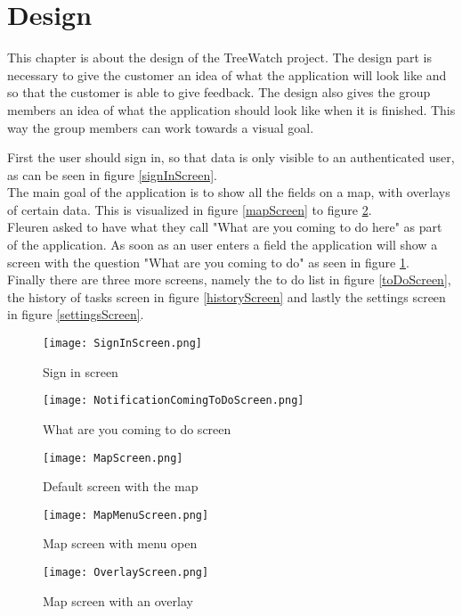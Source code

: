 \section{Design\label{sec:Design}}
This chapter is about the design of the TreeWatch project. The design part is necessary to give the customer an idea of what the application will look like and so that the customer is able to give feedback. The design also gives the group members an idea of what the application should look like when it is finished. This way the group members can work towards a visual goal.

First the user should sign in, so that data is only visible to an authenticated user, as can be seen in figure \ref{signInScreen}. \\
The main goal of the application is to show all the fields on a map, with overlays of certain data. This is visualized in figure \ref{mapScreen} to figure \ref{overlayScreen}. \\
Fleuren asked to have what they call "What are you coming to do here" as part of the application. As soon as an user enters a field the application will show a screen with the question "What are you coming to do" as seen in figure \ref{comingToDoScreen}. \\
Finally there are three more screens, namely the to do list in figure \ref{toDoScreen}, the history of tasks screen in figure \ref{historyScreen} and lastly the settings screen in figure \ref{settingsScreen}.

\begin{figure}[ht]
	\centering
	\texttt{[image: SignInScreen.png]}
	\caption{Sign in screen}\label{signInScreen}
	\endminipage\hfill
	\centering
	\texttt{[image: NotificationComingToDoScreen.png]}
	\caption{What are you coming to do screen}\label{comingToDoScreen}
	\endminipage\hfill
\end{figure}

\begin{figure}[ht]
	\centering
	\texttt{[image: MapScreen.png]}
	\caption{Default screen with the map}\label{mapScreen}
	\endminipage\hfill
	\centering
	\texttt{[image: MapMenuScreen.png]}
	\caption{Map screen with menu open}\label{mapMenuScreen}
	\endminipage\hfill
	\centering
	\texttt{[image: OverlayScreen.png]}
	\caption{Map screen with an overlay}\label{overlayScreen}
	\endminipage\hfill
\end{figure}

